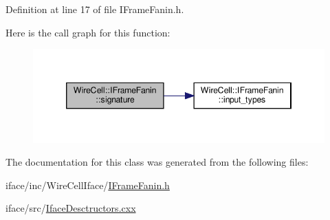 Definition at line 17 of file I\+Frame\+Fanin.\+h.

Here is the call graph for this function\+:
\nopagebreak
\begin{figure}[H]
\begin{center}
\leavevmode
\includegraphics[width=346pt]{class_wire_cell_1_1_i_frame_fanin_aebfb010bd1a132b11af4c25785e779bb_cgraph}
\end{center}
\end{figure}


The documentation for this class was generated from the following files\+:\begin{DoxyCompactItemize}
\item 
iface/inc/\+Wire\+Cell\+Iface/\hyperlink{_i_frame_fanin_8h}{I\+Frame\+Fanin.\+h}\item 
iface/src/\hyperlink{_iface_desctructors_8cxx}{Iface\+Desctructors.\+cxx}\end{DoxyCompactItemize}
